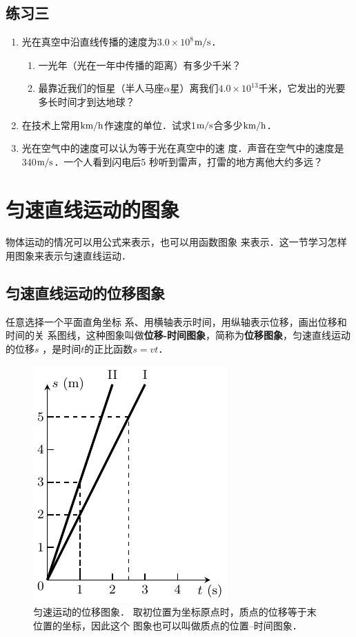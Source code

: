 \subsection*{练习三}

\begin{enumerate}
    \item 光在真空中沿直线传播的速度为$3.0\times 10^8$$\text{m}/\text{s}$．
\begin{enumerate}
    \item 一光年（光在一年中传播的距离）有多少千米？
    \item 最靠近我们的恒星（半人马座$\alpha$星）离我们$4.0\times 10^{13}$千米，它发出的光要多长时间才到达地球？
\end{enumerate}    
\item  在技术上常用$\text{km}/\text{h}$作速度的单位．试求1$\text{m}/\text{s}$合多少$\text{km}/\text{h}$．
\item 光在空气中的速度可以认为等于光在真空中的速
度．声音在空气中的速度是340$\text{m}/\text{s}$．一个人看到闪电后5
秒听到雷声，打雷的地方离他大约多远？

\end{enumerate}

\section{匀速直线运动的图象}
    物体运动的情况可以用公式来表示，也可以用函数图象
来表示．这一节学习怎样用图象来表示匀速直线运动．

    \subsection{匀速直线运动的位移图象} 
    
    任意选择一个平面直角坐标
系、用横轴表示时间，用纵轴表示位移，画出位移和时间的关
系图线，这种图象叫做\textbf{位移-时间图象}，简称为\textbf{位移图象}，匀速直线运动的位移$s$
，是时间$t$的正比函数$s=vt$．
\begin{figure}[htp]
    \centering
    \includegraphics{fig/A/2-8.pdf}
    \caption{匀速运动的位移图象．
    取初位置为坐标原点时，质点的位移等于末位置的坐标，因此这个
    图象也可以叫做质点的位置--时间图象．}\label{fig_A_2-8}
\end{figure}

